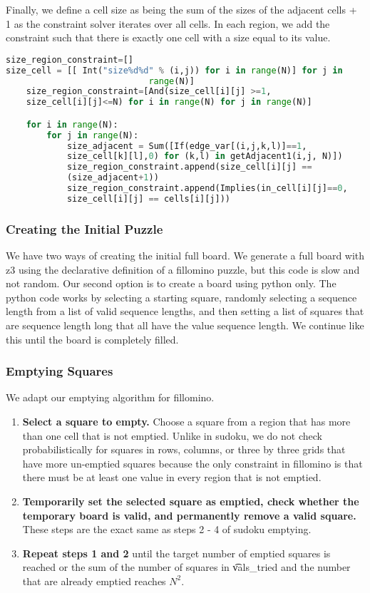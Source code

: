 Finally, we define a cell size as being the sum of the sizes of the
adjacent cells + 1 as the constraint solver iterates over all cells. In each region, we add the constraint such that there is exactly one cell with a size equal to its value. 

\singlespace
\begin{lstlisting}[language=python, frame=single]
size_region_constraint=[]
size_cell = [[ Int("size%d%d" % (i,j)) for i in range(N)] for j in
                            range(N)]
    size_region_constraint=[And(size_cell[i][j] >=1,
    size_cell[i][j]<=N) for i in range(N) for j in range(N)]

    for i in range(N):
        for j in range(N):
            size_adjacent = Sum([If(edge_var[(i,j,k,l)]==1,
            size_cell[k][l],0) for (k,l) in getAdjacent1(i,j, N)])
            size_region_constraint.append(size_cell[i][j] ==
            (size_adjacent+1))
            size_region_constraint.append(Implies(in_cell[i][j]==0,
            size_cell[i][j] == cells[i][j]))
\end{lstlisting}
\doublespace


\subsubsection{Creating the Initial Puzzle}
We have two ways of creating the initial full board. We generate a full board with z3 using the declarative definition of a fillomino puzzle, but this code is slow and not random. Our second option is to create a board using python only. The python code works by selecting a starting square, randomly selecting a sequence length from a list of
valid sequence lengths, and then setting a list of squares that are sequence length long that all have the value sequence length. We continue like this until the board is completely filled.


\subsubsection{Emptying Squares}

We adapt our emptying algorithm for fillomino.

\begin{enumerate}
\item {\bf Select a square to empty.} Choose a square from a region
  that has more than one cell that is not emptied. Unlike in sudoku, we do not check probabilistically for squares in rows, columns, or three by three grids that have more un-emptied squares because the only constraint in fillomino is that there must be at least one value in every region that is not emptied.
\item {\bf Temporarily set the selected square as emptied, check whether the temporary board is valid, and permanently remove a valid square.} These steps are the exact same as steps 2 - 4 of sudoku emptying.
\item{\bf Repeat steps 1 and 2} until the target number of emptied squares is reached or the sum of the number of squares in \t{vals\_tried} and the number that are already emptied reaches $N^2$. 
\end{enumerate}


